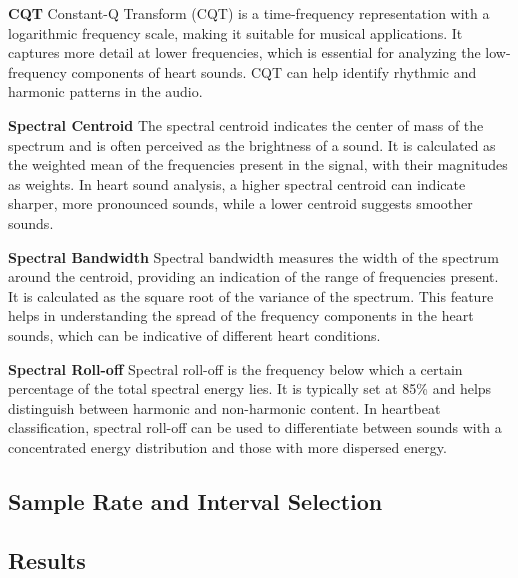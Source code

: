\vspace{0.5cm}\noindent
\textbf{CQT}\newline
Constant-Q Transform (CQT) is a time-frequency representation with a logarithmic frequency scale, making it suitable for musical applications. It captures more detail at lower frequencies, which is essential for analyzing the low-frequency components of heart sounds. CQT can help identify rhythmic and harmonic patterns in the audio.

\vspace{0.5cm}\noindent
\textbf{Spectral Centroid}\newline
The spectral centroid indicates the center of mass of the spectrum and is often perceived as the brightness of a sound. It is calculated as the weighted mean of the frequencies present in the signal, with their magnitudes as weights. In heart sound analysis, a higher spectral centroid can indicate sharper, more pronounced sounds, while a lower centroid suggests smoother sounds.

\vspace{0.5cm}\noindent
\textbf{Spectral Bandwidth}\newline
Spectral bandwidth measures the width of the spectrum around the centroid, providing an indication of the range of frequencies present. It is calculated as the square root of the variance of the spectrum. This feature helps in understanding the spread of the frequency components in the heart sounds, which can be indicative of different heart conditions.

\vspace{0.5cm}\noindent
\textbf{Spectral Roll-off}
Spectral roll-off is the frequency below which a certain percentage of the total spectral energy lies. It is typically set at 85\% and helps distinguish between harmonic and non-harmonic content. In heartbeat classification, spectral roll-off can be used to differentiate between sounds with a concentrated energy distribution and those with more dispersed energy.

\subsection{Sample Rate and Interval Selection}

\subsection{Results}

